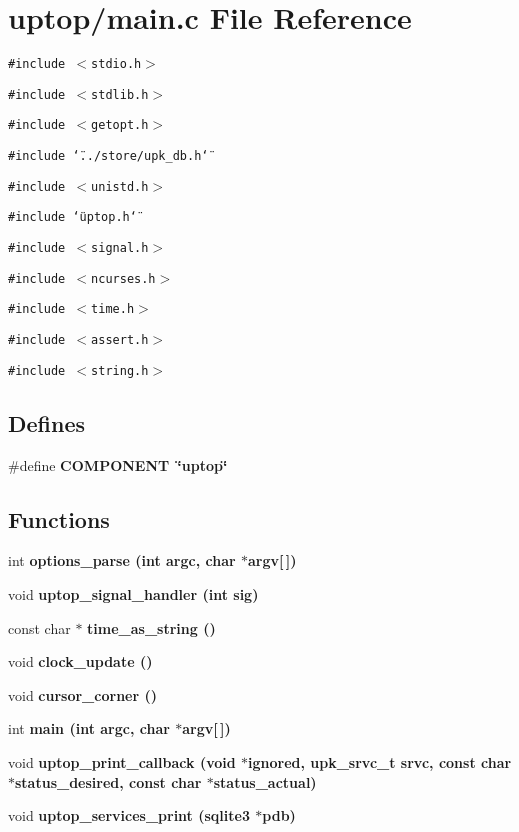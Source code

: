 \section{uptop/main.c File Reference}
\label{main_8c}
{\tt \#include $<$stdio.h$>$}\par
{\tt \#include $<$stdlib.h$>$}\par
{\tt \#include $<$getopt.h$>$}\par
{\tt \#include \char`\"{}../store/upk\_\-db.h\char`\"{}}\par
{\tt \#include $<$unistd.h$>$}\par
{\tt \#include \char`\"{}uptop.h\char`\"{}}\par
{\tt \#include $<$signal.h$>$}\par
{\tt \#include $<$ncurses.h$>$}\par
{\tt \#include $<$time.h$>$}\par
{\tt \#include $<$assert.h$>$}\par
{\tt \#include $<$string.h$>$}\par
\subsection*{Defines}
\begin{CompactItemize}
\item 
\#define \bf{COMPONENT}~\char`\"{}uptop\char`\"{}
\end{CompactItemize}
\subsection*{Functions}
\begin{CompactItemize}
\item 
int \bf{options\_\-parse} (int argc, char $\ast$argv[$\,$])
\item 
void \bf{uptop\_\-signal\_\-handler} (int sig)
\item 
const char $\ast$ \bf{time\_\-as\_\-string} ()
\item 
void \bf{clock\_\-update} ()
\item 
void \bf{cursor\_\-corner} ()
\item 
int \bf{main} (int argc, char $\ast$argv[$\,$])
\item 
void \bf{uptop\_\-print\_\-callback} (void $\ast$ignored, upk\_\-srvc\_\-t srvc, const char $\ast$status\_\-desired, const char $\ast$status\_\-actual)
\item 
void \bf{uptop\_\-services\_\-print} (sqlite3 $\ast$pdb)
\end{CompactItemize}

